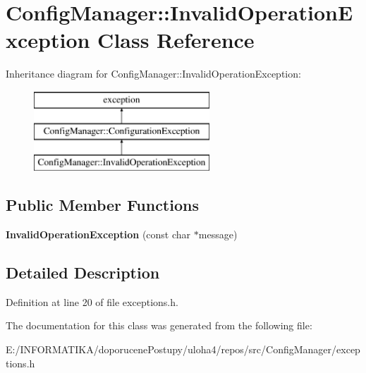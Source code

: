 \hypertarget{class_config_manager_1_1_invalid_operation_exception}{}\section{Config\+Manager\+:\+:Invalid\+Operation\+Exception Class Reference}
\label{class_config_manager_1_1_invalid_operation_exception}
Inheritance diagram for Config\+Manager\+:\+:Invalid\+Operation\+Exception\+:\begin{figure}[H]
\begin{center}
\leavevmode
\includegraphics[height=3.000000cm]{class_config_manager_1_1_invalid_operation_exception}
\end{center}
\end{figure}
\subsection*{Public Member Functions}
\begin{DoxyCompactItemize}
\item 
{\bfseries Invalid\+Operation\+Exception} (const char $\ast$message)\hypertarget{class_config_manager_1_1_invalid_operation_exception_aee04fbcabd25794c25f1d245fd9d5f29}{}\label{class_config_manager_1_1_invalid_operation_exception_aee04fbcabd25794c25f1d245fd9d5f29}

\end{DoxyCompactItemize}


\subsection{Detailed Description}


Definition at line 20 of file exceptions.\+h.



The documentation for this class was generated from the following file\+:\begin{DoxyCompactItemize}
\item 
E\+:/\+I\+N\+F\+O\+R\+M\+A\+T\+I\+K\+A/doporucene\+Postupy/uloha4/repos/src/\+Config\+Manager/exceptions.\+h\end{DoxyCompactItemize}
